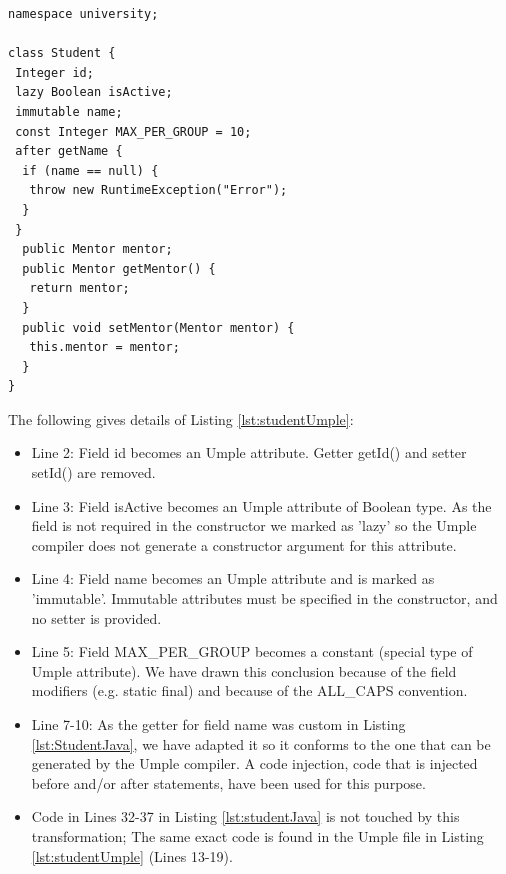 \begin{lstlisting}[style=UmpleOut,caption=Student.ump,label=lst:studentUmple]
namespace university;

class Student { 
 Integer id; 
 lazy Boolean isActive; 
 immutable name; 
 const Integer MAX_PER_GROUP = 10; 
 after getName {
  if (name == null) { 
   throw new RuntimeException("Error");
  }
 }
  public Mentor mentor; 
  public Mentor getMentor() { 
   return mentor; 
  }
  public void setMentor(Mentor mentor) { 
   this.mentor = mentor; 
  } 
}
\end{lstlisting}


The following gives details of Listing \ref{lst:studentUmple}:
\begin{itemize}
\item Line 2: Field id becomes an Umple attribute. Getter getId() and setter setId() are removed.


\item Line 3: Field isActive becomes an Umple attribute of Boolean type.  As the field is not required in the constructor we marked as 'lazy' so the Umple compiler does not generate a constructor argument for this attribute. 

\item Line 4: Field name becomes an Umple attribute and is marked as 'immutable'. Immutable attributes must be specified in the constructor, and no setter is provided.


\item Line 5: Field MAX\_PER\_GROUP becomes a constant (special type of Umple attribute). We have drawn this conclusion because of the field modifiers (e.g. static final) and because of the ALL\_CAPS convention. 

\item Line 7-10: As the getter for field name was custom in Listing \ref{lst:StudentJava}, we have adapted it so it conforms to the one that can be generated by the Umple compiler. A code injection, code that is injected before and/or after statements, have been used for this purpose.

\item Code in Lines 32-37 in Listing \ref{lst:studentJava} is not touched by this transformation; The same exact code is found in the Umple file in Listing \ref{lst:studentUmple} (Lines 13-19).

\end{itemize}

